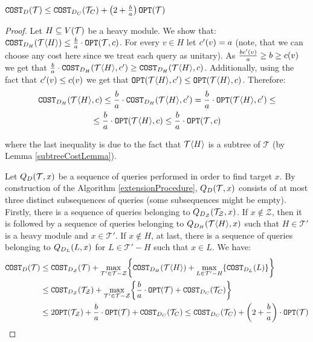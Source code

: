 \begin{lemma}
    $\COST_D\br{\mathcal{T}}\leq\COST_{D_C}\br{\mathcal{T}_C}+\br{2+\frac{b}{a}}\OPT\br{\mathcal{T}}$
    \begin{proof}
    Let $H\subseteq V\br{\mathcal{T}}$ be a heavy module. We show that: $\COST_{D_H}\br{\mathcal{T}\angl{H}}\leq \frac{b}{a}\cdot\OPT\br{\mathcal{T}, c}$. For every $v\in H$ let $c'\br{v}=a$ (note, that we can choose any cost here since we treat each query as unitary). As $\frac{bc'\br{v}}{a}\geq b \geq c\br{v}$ we get that $\frac{b}{a}\cdot\COST_{D_H}\br{\mathcal{T}\angl{H}, c'}\geq \COST_{D_H}\br{\mathcal{T}\angl{H}, c}$. Additionally, using the fact that $c'\br{v} \leq c\br{v}$ we get that $\OPT\br{\mathcal{T}\angl{H}, c'}\leq \OPT\br{\mathcal{T}\angl{H}, c}$. Therefore:
    $$
    \begin{gathered}
        \COST_{D_H}\br{\mathcal{T}\angl{H}, c}\leq \frac{b}{a}\cdot\COST_{D_H}\br{\mathcal{T}\angl{H}, c'}=\frac{b}{a}\cdot\OPT\br{\mathcal{T}\angl{H}, c'}\leq \\
        \leq
        \frac{b}{a}\cdot\OPT\br{\mathcal{T}\angl{H}, c}\leq \frac{b}{a}\cdot\OPT\br{\mathcal{T}, c}
    \end{gathered}
    $$
        
    where the last inequality is due to the fact that $\mathcal{T}\angl{H}$ is a subtree of $\mathcal{T}$ (by Lemma \ref{subtreeCostLemma}).
        
    Let $Q_D\br{\mathcal{T},x}$ be a sequence of queries performed in order to find target $x$. By construction of the Algorithm \ref{extensionProcedure}, $Q_D\br{\mathcal{T},x}$ consists of at most three distinct subsequences of queries (some subsequences might be empty). Firstly, there is a sequence of queries belonging to $Q_{D_{\mathcal{Z}}}\br{\mathcal{T}_{\mathcal{Z}},x}$. If $x\notin \mathcal{Z}$, then it is followed by a sequence of queries belonging to $Q_{D_{H}}\br{\mathcal{T}\angl{H},x}$ such that $H\in \mathcal{T}'$ is a heavy module and $x\in \mathcal{T}'$. If $x\notin H$, at last, there is a sequence of queries belonging to $Q_{D_{L}}\br{L,x}$ for $L\in \mathcal{T}'-H$ such that $x\in L$. 
    We have:
        \begin{align*}
        \COST_D\br{\mathcal{T}}&\leq
        \COST_{D_{\mathcal{Z}}}\br{\mathcal{T}}+\max_{\mathcal{T}'\in \mathcal{T}-\mathcal{Z}}\brc{\COST_{D_H}\br{\mathcal{T}\angl{H}}+\max_{L\in \mathcal{T}'-H}\brc{\COST_{D_L}\br{L}}}
        \\ 
        &\leq
        \COST_{D_{\mathcal{Z}}}\br{\mathcal{T}_{\mathcal{Z}}}+\max_{\mathcal{T}'\in \mathcal{T}-\mathcal{Z}}\brc{\frac{b}{a}\cdot\OPT\br{\mathcal{T}}+\COST_{D_C}\br{\mathcal{T}_C}}
        \\
        &\leq
        2\OPT\br{\mathcal{T}_{\mathcal{Z}}}+\frac{b}{a}\cdot\OPT\br{\mathcal{T}}+ \COST_{D_C}\br{\mathcal{T}_C} \leq \COST_{D_C}\br{\mathcal{T}_C} + \br{2+\frac{b}{a}}\cdot\OPT\br{\mathcal{T}}
        \end{align*}


\end{proof}
\end{lemma}
